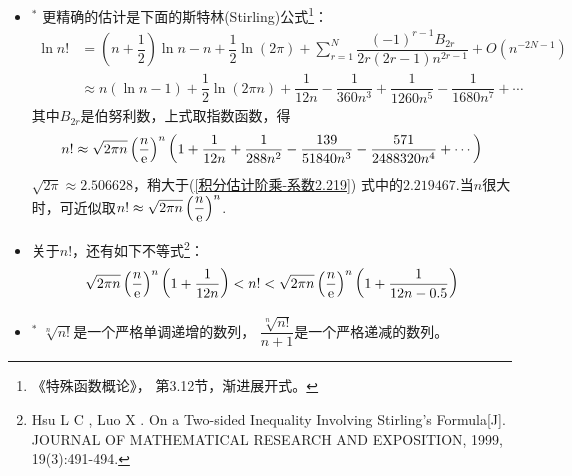 \begin{itemize}[leftmargin=\inteval{\myitemleftmargin}pt,itemsep=
   \inteval{\myitemitempsep}pt,topsep=\inteval{\myitemtopsep}pt]
\item $^*$ 更精确的估计是下面的斯特林(Stirling)公式\footnote{《特殊函数概论》，
    第3.12节，渐进展开式。 }：
\begin{align}
    \ln n! &= \left(n+\dfrac{1}{2}\right)\ln n-n+\dfrac{1}{2}\ln(2\pi)+
    \sum_{r=1}^{N}\dfrac{(-1)^{r-1}B_{2r}}{2r(2r-1)n^{2r-1}}+O(n^{-2N-1}) \label{斯特林公式对数形式1-伯努利数} \\
    & \approx n(\ln n-1)+\dfrac{1}{2}\ln(2\pi n)+\dfrac{1}{12n}-
    \dfrac{1}{360n^3}+\dfrac{1}{1260n^5}-\dfrac{1}{1680n^7}+\cdots 
    \label{斯特林公式对数形式2}
\end{align}
其中$ B_{2r} $是伯努利数，上式取指数函数，得
\begin{gather}\label{斯特林公式指数形式}
    n!\approx \sqrt{2\pi n}\left(\dfrac{n}{\mathrm{e}}\right)^n \left(1+
    \dfrac{1}{12n}+\dfrac{1}{288n^2}-\dfrac{139}{51840n^3}-
    \dfrac{571}{2488320n^4}+\cdots \right)   
\end{gather}
$ \sqrt{2\pi}\approx 2.506628 $，稍大于(\ref{积分估计阶乘-系数2.219})
式中的$ 2.219467 $.当$ n $很大时，可近似取$ n!\approx \sqrt{2\pi n}\left(\dfrac{n}{\mathrm{e}}\right)^n $.

\item 关于$ n! $，还有如下不等式\footnote{Hsu L C ,  Luo X . On a 
    Two-sided Inequality Involving Stirling's Formula[J]. JOURNAL OF MATHEMATICAL RESEARCH AND EXPOSITION, 1999, 19(3):491-494.}：
\begin{gather}\label{阶乘-斯特林不等式}
    \sqrt{2\pi n}\left(\dfrac{n}{\mathrm{e}}\right)^n \left(1+\dfrac{1}{12n}\right)
    <n!<\sqrt{2\pi n}\left(\dfrac{n}{\mathrm{e}}\right)^n \left(1+
    \dfrac{1}{12n-0.5}\right)
\end{gather}

\item $^*$ $ \sqrt[n]{n!} $是一个严格单调递增的数列，
$ \dfrac{\sqrt[n]{n!}}{n+1} $是一个严格递减的数列。\\


\end{itemize}

